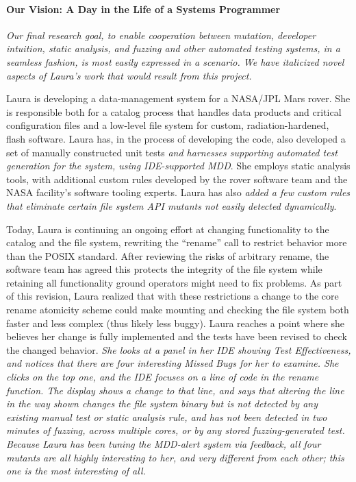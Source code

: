 \paragraph{Our Vision: A Day in the Life of a Systems Programmer}

\begin{framed} \emph{Our final research goal, to enable cooperation between mutation, developer intuition, static analysis, and fuzzing and other automated testing systems, in a seamless fashion, is most easily expressed in a scenario.  We have italicized novel aspects of Laura's work that would result from this project.}
  \end{framed}

Laura is developing a data-management system for a NASA/JPL Mars rover.  She is responsible both for a catalog process that handles data products and critical configuration files and a low-level file system for custom, radiation-hardened, flash software.  Laura has, in the process of developing the code, also developed a set of manually constructed unit tests \emph{and harnesses supporting automated test generation for the system, using IDE-supported MDD}.  She employs static analysis tools, with additional custom rules developed by the rover software team and the NASA facility's software tooling experts.  Laura has also \emph{added a few custom rules that eliminate certain file system API mutants not easily detected dynamically}.

Today, Laura is continuing an ongoing effort at changing functionality to the catalog and the file system, rewriting the ``rename'' call to restrict behavior more than the POSIX standard.  After reviewing the risks of arbitrary rename, the software team has agreed this protects the integrity of the file system while retaining all functionality ground operators might need to fix problems.  As part of this revision, Laura realized that with these restrictions a change to the core rename atomicity scheme could make mounting and checking the file system both faster and less complex (thus likely less buggy).
Laura reaches a point where she believes her change is fully implemented and the tests have been revised to check the changed behavior.  \emph{She looks at a panel in her IDE showing Test Effectiveness, and notices that there are four interesting Missed Bugs for her to examine.  She clicks on the top one, and the IDE focuses on a line of code in the rename function.  The display shows a change to that line, and says that altering the line in the way shown changes the file system binary but is not detected by any existing manual test or static analysis rule, and has not been detected in two minutes of fuzzing, across multiple cores, or by any stored fuzzing-generated test.  Because Laura has been tuning the MDD-alert system via feedback, all four mutants are all highly interesting to her, and very different from each other; this one is the most interesting of all.}

